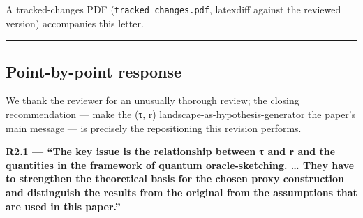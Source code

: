 \documentclass[
  11pt,
]{article}
\begin{document}
A tracked-changes PDF (\texttt{tracked\_changes.pdf}, latexdiff against
the reviewed version) accompanies this letter.

\begin{center}\rule{0.5\linewidth}{0.5pt}\end{center}

\subsection{Point-by-point response}\label{point-by-point-response}

We thank the reviewer for an unusually thorough review; the closing
recommendation --- make the (τ, r) landscape-as-hypothesis-generator the
paper's main message --- is precisely the repositioning this revision
performs.

\textbf{R2.1 --- ``The key issue is the relationship between τ and r and
the quantities in the framework of quantum oracle-sketching. \ldots{}
They have to strengthen the theoretical basis for the chosen proxy
construction and distinguish the results from the original from the
assumptions that are used in this paper.''}
\end{document}
